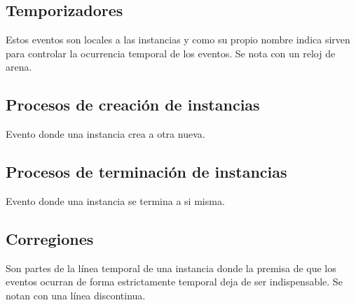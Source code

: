 \subsection*{Temporizadores}
Estos eventos son locales a las instancias y como su propio nombre
indica sirven para controlar la ocurrencia temporal de los eventos. Se
nota con un reloj de arena.


\subsection*{Procesos de creación de instancias} 
Evento donde una instancia crea a otra nueva.
\subsection*{Procesos de terminación de instancias}
Evento donde una instancia se termina a si misma.
\subsection*{Corregiones}
Son partes de la línea temporal de una instancia donde la premisa de
que los eventos ocurran de forma estrictamente temporal deja de ser
indispensable. Se notan con una línea discontinua.


